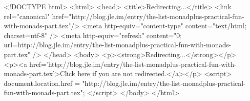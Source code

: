 <!DOCTYPE html>
<html>
<head>
<title>Redirecting...</title>
<link rel="canonical" href="http://blog.jle.im/entry/the-list-monadplus-practical-fun-with-monads-part.tex"/>
<meta http-equiv="content-type" content="text/html; charset=utf-8" />
<meta http-equiv="refresh" content="0; url=http://blog.jle.im/entry/the-list-monadplus-practical-fun-with-monads-part.tex" />
</head>
<body>
  <p><strong>Redirecting...</strong></p>
  <p><a href='http://blog.jle.im/entry/the-list-monadplus-practical-fun-with-monads-part.tex'>Click here if you are not redirected.</a></p>
  <script>
    document.location.href = "http://blog.jle.im/entry/the-list-monadplus-practical-fun-with-monads-part.tex";
  </script>
</body>
</html>
